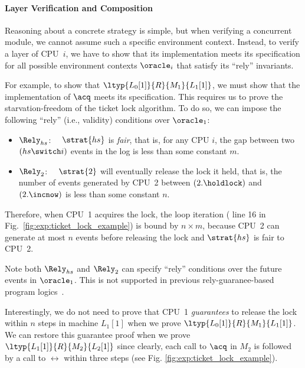 \paragraph{Layer Verification and Composition}
Reasoning about a concrete strategy is simple, but when  verifying
a concurrent module, we cannot assume such a specific environment context.
Instead, to verify
a layer of CPU~$i$, we have to show that its implementation
meets its specification for all possible environment contexts
$\oracle_i$ that satisfy its ``rely'' invariants.

For example, to show that $\ltyp{L_0[1]}{R}{M_1}{L_1[1]}$, we must
show that the implementation of $\acq$ meets its specification.
This requires us to prove the starvation-freedom of the ticket
lock algorithm. To do so, we can impose the following ``rely'' (i.e.,
validity) conditions over $\oracle_1$:
\begin{itemize} %
\item $\Rely_{hs}$:~~  $\strat{hs}$ is \emph{fair}, that is,
  for any CPU $i$, the gap between two $(hs \switch i)$ events
  in the log is less than some constant $m$.
\item $\Rely_{2}$:~~  $\strat{2}$ will eventually release the
  lock it held, that is, the number of events generated by CPU~2
  between $(2.\holdlock)$ and $(2.\incnow)$   is less
  than some constant $n$.
\end{itemize}
Therefore, when CPU~1 acquires the lock, the loop iteration (\cf
line 16 in Fig.~\ref{fig:exp:ticket_lock_example}) is bound by
$n \times m$, because CPU~2 can generate at most $n$ events before
releasing the lock and $\strat{hs}$ is fair to CPU~2.

Note both $\Rely_{hs}$ and $\Rely_{2}$ can specify ``rely''
conditions over the future events in $\oracle_1$. This is not
supported in previous rely-guaranee-based program
logics~\cite{feng07:sagl,vafeiadis:marriage,LRG,fu10:roch,sergey15}.

Interestingly, we do not need to prove that CPU~1 \emph{guarantees} to
release the lock within $n$ steps in machine $L_1[1]$ when we prove
$\ltyp{L_0[1]}{R}{M_1}{L_1[1]}$.  We can restore this guarantee proof
when we prove $\ltyp{L_1[1]}{R}{M_2}{L_2[1]}$ since clearly, each call
to $\acq$ in $M_2$ is followed by a call to $\rel$ within three steps
(see Fig. \ref{fig:exp:ticket_lock_example}).

